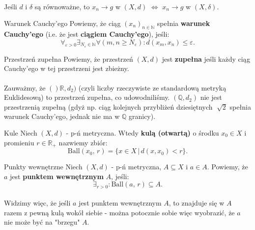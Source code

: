 \documentclass{article}
\numberwithin{defi}{section}
\numberwithin{theo}{section}
\numberwithin{defi}{section}
\newcommand{\R}{\mathbb{R}}
\newcommand{\N}{\mathbb{N}}
\newcommand{\Q}{\mathbb{Q}}
\newcommand{\eps}{\varepsilon}
\newcommand{\ciag}[1]{(#1_{n})_{n \in \N}}
\newcommand{\ball}[2]{\text{Ball}(#1, \, #2)}
\begin{document}
\begin{obs}{}
    Jeśli $d$ i $\delta$ są równoważne, to $x_n \to g$ w $(X, d)$ $\iff$ $x_n \to g$ w $(X, \delta)$.
\end{obs}

\begin{defr}{Warunek Cauchy'ego}
    Powiemy, że ciąg $\ciag{x}$ spełnia \textbf{warunek Cauchy'ego} (i.e. że jest \textbf{ciągiem Cauchy'ego}), jeśli:
    \begin{equation}
        \forall_{\eps > 0} \exists_{N_\eps \in \N} \forall (m,n \geqslant N_\eps): d(x_m, x_n) \leqslant \eps.
    \end{equation}
\end{defr}

\begin{defr}{Przestrzeń zupełna}
    Powiemy, że przestrzeń $(X,d)$ jest \textbf{zupełna} jeśli każdy ciąg Cauchy'ego w tej przestrzeni jest zbieżny.
\end{defr}

\paragraph{} Zauważmy, że $()\R, d_2)$ (czyli liczby rzeczywiste ze standardową metryką Euklidesową) to przestrzeń zupełna, co udowodniliśmy. $(\Q, d_2)$ nie jest przestrzenią zupełną (gdyż np. ciąg kolejnych przybliżeń dziesiętnych $\sqrt[]{2}$ spełnia warunek Cauchy'ego, jednak nie ma w $\Q$ granicy).\

\begin{defr}{Kule}
    Niech $(X, d)$ - p-ń metryczna. Wtedy \textbf{kulą (otwartą)} o środku $x_0 \in X$ i promieniu $r \in \R_+$ nazwiemy zbiór:
    \begin{equation}
        \ball{x_0}{r} = \{ x\in X \, | \, d(x, x_0) < r\}.
    \end{equation}
\end{defr}

\begin{defr}{Punkty wewnętrzne}
    Niech $(X, d)$ - p-ń metryczna, $A \subseteq X$ i $a \in A$. Powiemy, że $a$ jest \textbf{punktem wewnętrznym} $A$, jeśli:
    \begin{equation}
        \exists_{r>0}: \ball{a}{r} \subseteq A.
    \end{equation}
\end{defr}

\paragraph{} Widzimy więc, że jeśli $a$ jest punktem wewnętrznym $A$, to znajduje się w $A$ razem z pewną kulą wokół siebie - można potocznie sobie więc wyobrazić, że $a$ nie może być na "brzegu" $A$.
\end{document}
